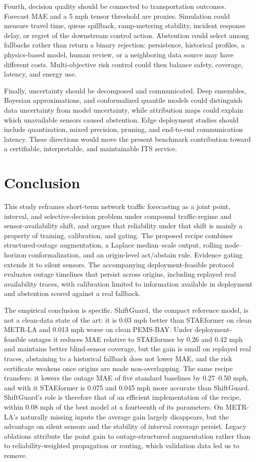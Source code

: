 \documentclass[preprint,12pt]{elsarticle}
\begin{document}
Fourth, decision quality should be connected to transportation outcomes.
Forecast MAE and a 5 mph tensor threshold are proxies. Simulation could measure
travel time, queue spillback, ramp-metering stability, incident response delay,
or regret of the downstream control action. Abstention could select among
fallbacks rather than return a binary rejection: persistence, historical
profiles, a physics-based model, human review, or a neighboring data source may
have different costs. Multi-objective risk control could then balance safety,
coverage, latency, and energy use.

Finally, uncertainty should be decomposed and communicated. Deep ensembles,
Bayesian approximations, and conformalized quantile models could distinguish
data uncertainty from model uncertainty, while attribution maps could explain
which unavailable sensors caused abstention. Edge deployment studies should
include quantization, mixed precision, pruning, and end-to-end communication
latency. These directions would move the present benchmark contribution toward
a certifiable, interpretable, and maintainable ITS service.

\section{Conclusion}
This study reframes short-term network traffic forecasting as a joint point,
interval, and selective-decision problem under compound traffic-regime and
sensor-availability shift, and argues that reliability under that shift is
mainly a property of training, calibration, and gating. The proposed recipe
combines structured-outage augmentation, a Laplace median--scale output,
rolling node--horizon conformalization, and an origin-level act/abstain rule.
Evidence gating extends it to silent sensors. The accompanying deployment-feasible
protocol evaluates outage timelines that persist across origins, including
replayed real availability traces, with calibration limited to information
available in deployment and abstention scored against a real fallback.

The empirical conclusion is specific. ShiftGuard, the compact reference model,
is not a clean-data state of the art: it is 0.03 mph better than STAEformer on
clean METR-LA and 0.013 mph worse on clean PEMS-BAY. Under deployment-feasible
outages it reduces MAE relative to STAEformer by 0.26 and 0.42 mph and maintains
better blind-sensor coverage, but the gain is small on replayed real traces,
abstaining to a historical fallback does not lower MAE, and the risk certificate
weakens once origins are made non-overlapping. The same recipe transfers: it lowers
the outage MAE of five standard baselines by 0.27--0.50 mph, and with it STAEformer
is 0.075 and 0.045 mph more accurate than ShiftGuard. ShiftGuard's role is therefore
that of an efficient implementation of the recipe, within 0.08 mph of the best model
at a fourteenth of its parameters. On METR-LA's
naturally missing inputs the average gain largely disappears, but the advantage
on silent sensors and the stability of interval coverage persist. Legacy ablations
attribute the point gain to outage-structured augmentation rather than to
reliability-weighted propagation or routing, which validation data led us to
remove.
\end{document}
